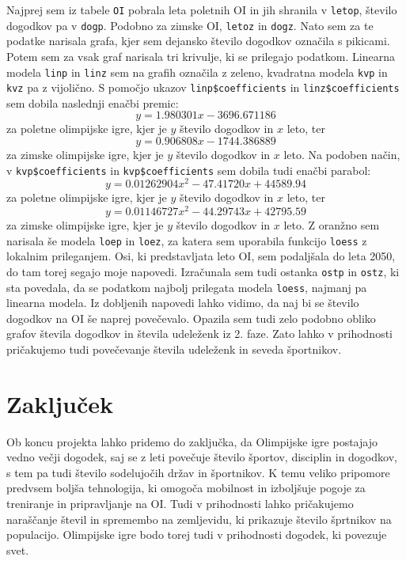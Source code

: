 \documentclass[11pt,a4paper]{article}
\begin{document}
\begin{enumerate}
{Najprej sem iz tabele \verb|OI| pobrala leta poletnih OI in jih shranila v \verb|letop|, število dogodkov pa v \verb|dogp|. Podobno za zimske OI, \verb|letoz| in \verb|dogz|. Nato sem za te podatke narisala grafa, kjer sem dejansko število dogodkov označila s pikicami. Potem sem za vsak graf narisala tri krivulje, ki se prilegajo podatkom. Linearna modela \verb|linp| in \verb|linz| sem na grafih označila z zeleno, kvadratna modela \verb|kvp| in \verb|kvz| pa z vijolično. S pomočjo ukazov \verb|linp$coefficients| in \verb|linz$coefficients| sem dobila naslednji enačbi premic:
$$y=1.980301x-3696.671186$$ za poletne olimpijske igre, kjer je $y$ število dogodkov in $x$ leto, ter $$y=0.906808x-1744.386889$$ za zimske olimpijske igre, kjer je $y$ število dogodkov in $x$ leto. Na podoben način, v \verb|kvp$coefficients| in \verb|kvp$coefficients| sem dobila tudi enačbi parabol: $$y=0.01262904x^2-47.41720x+44589.94$$ za poletne olimpijske igre, kjer je $y$ število dogodkov in $x$ leto, ter $$y=0.01146727x^2-44.29743x+42795.59$$ za zimske olimpijske igre, kjer je $y$ število dogodkov in $x$ leto.
Z oranžno sem narisala še modela \verb|loep| in \verb|loez|, za katera sem uporabila funkcijo \verb|loess| z lokalnim prileganjem. Osi, ki predstavljata leto OI, sem podaljšala do leta 2050, do tam torej segajo moje napovedi. Izračunala sem tudi ostanka \verb|ostp| in \verb|ostz|, ki sta povedala, da se podatkom najbolj prilegata modela \verb|loess|, najmanj pa linearna modela.
\newline
Iz dobljenih napovedi lahko vidimo, da naj bi se število dogodkov na OI še naprej povečevalo. Opazila sem tudi zelo podobno obliko grafov števila dogodkov in števila udeleženk iz 2. faze. Zato  lahko v prihodnosti pričakujemo tudi povečevanje števila udeleženk in seveda športnikov.
}

\end{enumerate}

\section{Zaključek}
Ob koncu projekta lahko pridemo do zaključka, da Olimpijske igre postajajo vedno večji dogodek, saj se z leti povečuje število športov, disciplin in dogodkov, s tem pa tudi število sodelujočih držav in športnikov. K temu veliko pripomore predvsem boljša tehnologija, ki omogoča mobilnost in izboljšuje pogoje za treniranje in pripravljanje na OI. Tudi v prihodnosti lahko pričakujemo naraščanje števil in spremembo na zemljevidu, ki prikazuje število šprtnikov na populacijo. Olimpijske igre bodo torej tudi v prihodnosti dogodek, ki povezuje svet.
\end{document}

